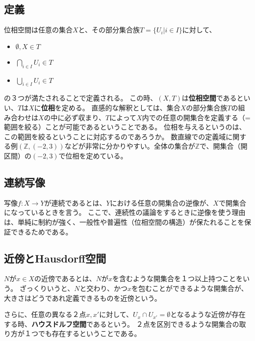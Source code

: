 \documentclass[a4paper]{jsreport}
\begin{document}
            \subsection*{定義}
                位相空間は任意の集合$X$と、その部分集合族$T = \{U_i | i \in I\}$に対して、
                \begin{itemize}
                    \item $\emptyset, X \in T$
                    \item $\bigcap_{i \in I} U_i \in T$
                    \item $\bigcup_{i \in I} U_i \in T$
                \end{itemize}
                の３つが満たされることで定義される。
                この時、$(X, T)$は\textbf{位相空間}であるといい、$T$は$X$に\textbf{位相}を定める。
                直感的な解釈としては、集合$X$の部分集合族$T$の組み合わせは$X$の中に必ず収まり、$T$によって$X$内での任意の開集合を定義する（=範囲を絞る）ことが可能であるということである。
                位相を与えるというのは、この範囲を絞るということに対応するのであろうか。
                数直線での定義域に関する例$(\mathbb{Z}, (-2, 3))$などが非常に分かりやすい。全体の集合が$\mathbb{Z}$で、開集合（開区間）の$(-2, 3)$で位相を定めている。

            \subsection*{連続写像}
                  写像$f:X \to Y$が連続であるとは、$Y$における任意の開集合の逆像が、$X$で開集合になっているときを言う。
                  ここで、連続性の議論をするときに逆像を使う理由は、単純に制約が強く、一般性や普遍性（位相空間の構造）が保たれることを保証できるためである。

            \subsection*{近傍とHausdorff空間}
                $N$が$x \in X$の近傍であるとは、$N$が$x$を含むような開集合を１つ以上持つことをいう。
                ざっくりいうと、$N$と交わり、かつ$x$を包むことができるような開集合が、大きさはどうであれ定義できるものを近傍という。\par
                さらに、任意の異なる２点$x, x'$に対して、$U_{x} \cap U_{x'} = \emptyset$となるような近傍が存在する時、\textbf{ハウスドルフ空間}であるという。
                ２点を区別できるような開集合の取り方が１つでも存在するということである。
\end{document}

